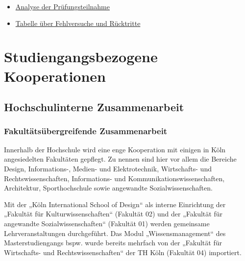 \begin{itemize}
\tightlist
\item
  \href{https://th-koeln.github.io/mi-2017/anhaenge/ba-pruefungsplan_mi.pdf}{Analyse der
  Prüfungsteilnahme}
\item
  \href{https://th-koeln.github.io/mi-2017/anhaenge/ba-pruefungen-fehlversuche-und-ruecktritte.pdf}{Tabelle
  über Fehlversuche und Rücktritte}
\end{itemize}

\chapter{Studiengangsbezogene
Kooperationen\label{/mi-2017/selbstbericht/0700-studiengangsbezogene-kooperationen/0000-studiengangsbezogene-kooperationen}}\label{studiengangsbezogene-kooperationenpathlabelmi-2017selbstbericht0700-studiengangsbezogene-kooperationen0000-studiengangsbezogene-kooperationen}

\section{Hochschulinterne
Zusammenarbeit\label{/mi-2017/selbstbericht/0700-studiengangsbezogene-kooperationen/0000-studiengangsbezogene-kooperationen}}\label{hochschulinterne-zusammenarbeitpathlabelmi-2017selbstbericht0700-studiengangsbezogene-kooperationen0000-studiengangsbezogene-kooperationen}

\subsection{Fakultätsübergreifende
Zusammenarbeit\label{/mi-2017/selbstbericht/0700-studiengangsbezogene-kooperationen/0000-studiengangsbezogene-kooperationen}}\label{fakultuxe4tsuxfcbergreifende-zusammenarbeitpathlabelmi-2017selbstbericht0700-studiengangsbezogene-kooperationen0000-studiengangsbezogene-kooperationen}

Innerhalb der Hochschule wird eine enge Kooperation mit einigen in Köln
angesiedelten Fakultäten gepflegt. Zu nennen sind hier vor allem die
Bereiche Design, Informations-, Medien- und Elektrotechnik, Wirtschafts-
und Rechtswissenschaften, Informations- und
Kommunikationswissenschaften, Architektur, Sporthochschule sowie
angewandte Sozialwissenschaften.

Mit der „Köln International School of Design`` als interne Einrichtung
der „Fakultät für Kulturwissenschaften`` (Fakultät 02) und der „Fakultät
für angewandte Sozialwissenschaften`` (Fakultät 01) werden gemeinsame
Lehrveranstaltungen durchgeführt. Das Modul „Wissensmanagement`` des
Masterstudiengangs bspw. wurde bereits mehrfach von der „Fakultät für
Wirtschafts- und Rechtswissenschaften`` der TH Köln (Fakultät 04)
importiert.

